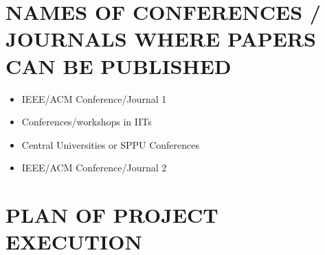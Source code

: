 \documentclass[12pt,a4paper]{report}
\begin{document}
\section{NAMES OF CONFERENCES / JOURNALS WHERE PAPERS CAN BE PUBLISHED}
\begin{itemize}
\item IEEE/ACM Conference/Journal 1
\item Conferences/workshops in IITs
\item Central Universities or SPPU Conferences
\item IEEE/ACM Conference/Journal 2
\end{itemize}

\section{PLAN OF PROJECT EXECUTION}
\end{document}
